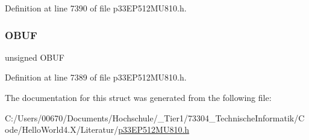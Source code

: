 Definition at line 7390 of file p33\+E\+P512\+M\+U810.\+h.

\mbox{\label{structtag_p_m_s_t_a_t_b_i_t_s_a74f6fa1b58aeb6463ddbe165a94b851c}} 
\subsubsection{\texorpdfstring{O\+B\+UF}{OBUF}}
{\footnotesize\ttfamily unsigned O\+B\+UF}



Definition at line 7389 of file p33\+E\+P512\+M\+U810.\+h.



The documentation for this struct was generated from the following file\+:\begin{DoxyCompactItemize}
\item 
C\+:/\+Users/00670/\+Documents/\+Hochschule/\+\_\+\+Tier1/73304\+\_\+\+Technische\+Informatik/\+Code/\+Hello\+World4.\+X/\+Literatur/\hyperlink{p33_e_p512_m_u810_8h}{p33\+E\+P512\+M\+U810.\+h}\end{DoxyCompactItemize}
